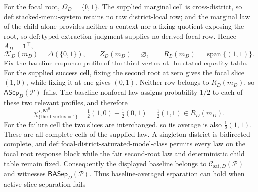 For the focal root, \(\Omega_D=\{0,1\}\).  The supplied marginal cell is cross-district, so \(\mathrm{def:stacked\text{-}menu\text{-}system}\) retains no raw district-local row; and the marginal law of the child alone provides neither a context nor a fixing quotient exposing the root, so \(\mathrm{def:typed\text{-}extraction\text{-}judgment}\) supplies no derived focal row.  Hence \(A_D=\mathbf 1^\top\),
\[
\mathcal K_D(m_D)=\Delta(\{0,1\}),\qquad
Z_D(m_D)=\varnothing,\qquad
R_D(m_D)=\operatorname{span}\{(1,1)\}.
\]
Fix the baseline response profile of the third vertex at the stated equality table.  For the supplied success cell, fixing the second root at zero gives the focal slice \((1,0)\), while fixing it at one gives \((0,1)\).  Neither row belongs to \(R_D(m_D)\), so \(\mathsf{ASep}_D(\mathcal P)\) fails.  The baseline nonfocal law assigns probability \(1/2\) to each of these two relevant profiles, and therefore
\[
\bar\chi^{\star,\mathbf M^0}_{\{\text{third vertex}=1\}}
=\tfrac12(1,0)+\tfrac12(0,1)
=\tfrac12(1,1)\in R_D(m_D).
\]
For the failure cell the two slices are interchanged, so its average is also \(\tfrac12(1,1)\).  These are all complete cells of the supplied law.  A singleton district is bidirected complete, and \(\mathrm{def:focal\text{-}district\text{-}saturated\text{-}model\text{-}class}\) permits every law on the focal root response block while the fair second-root law and deterministic child table remain fixed.  Consequently the displayed baseline belongs to \(\mathcal C_{\mathrm{sat},D}(\mathcal P)\) and witnesses \(\mathsf{BASep}_D(\mathcal P)\).  Thus baseline-averaged separation can hold when active-slice separation fails.